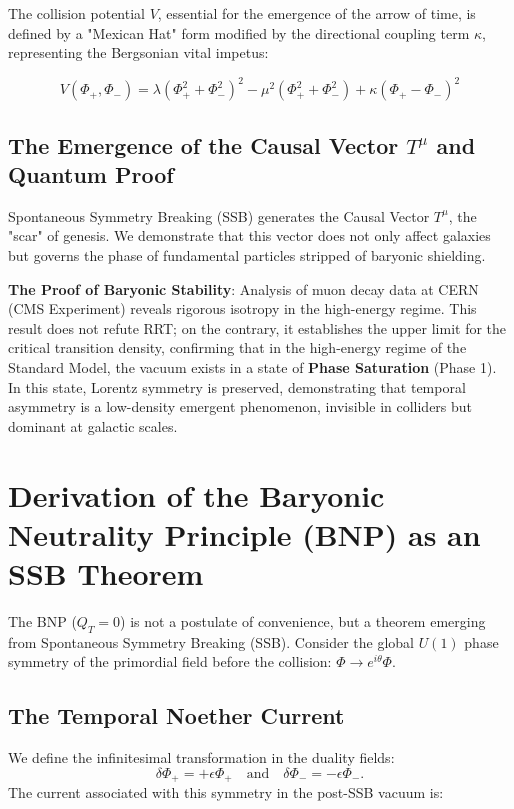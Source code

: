 \documentclass[12pt, a4paper]{article}
\begin{document}
The collision potential \(V\), essential for the emergence of the arrow of time, is defined by a "Mexican Hat" form modified by the directional coupling term \(\kappa\), representing the Bergsonian vital impetus:

\[
V(\Phi_{+}, \Phi_{-}) = \lambda(\Phi_{+}^{2} + \Phi_{-}^{2})^{2} - \mu^{2}(\Phi_{+}^{2} + \Phi_{-}^{2}) + \kappa(\Phi_{+} - \Phi_{-})^{2}
\]

\subsection{The Emergence of the Causal Vector \texorpdfstring{\(T^{\mu}\)}{T\textasciicircum mu} and Quantum Proof}

Spontaneous Symmetry Breaking (SSB) generates the Causal Vector \(T^{\mu}\), the "scar" of genesis. We demonstrate that this vector does not only affect galaxies but governs the phase of fundamental particles stripped of baryonic shielding.

\textbf{The Proof of Baryonic Stability}:
Analysis of muon decay data at CERN (CMS Experiment) reveals rigorous isotropy in the high-energy regime. This result does not refute RRT; on the contrary, it establishes the upper limit for the critical transition density, confirming that in the high-energy regime of the Standard Model, the vacuum exists in a state of \textbf{Phase Saturation} (Phase 1). In this state, Lorentz symmetry is preserved, demonstrating that temporal asymmetry is a low-density emergent phenomenon, invisible in colliders but dominant at galactic scales.

\section{Derivation of the Baryonic Neutrality Principle (BNP) as an SSB Theorem}

The BNP (\(Q_T = 0\)) is not a postulate of convenience, but a theorem emerging from Spontaneous Symmetry Breaking (SSB). Consider the global \(U(1)\) phase symmetry of the primordial field before the collision: \(\Phi \rightarrow e^{i\theta}\Phi\).

\subsection{The Temporal Noether Current}
We define the infinitesimal transformation in the duality fields: 
\[
\delta\Phi_+ = +\epsilon\Phi_+ \quad \text{and} \quad \delta\Phi_- = -\epsilon\Phi_-.
\]
The current associated with this symmetry in the post-SSB vacuum is:
\end{document}
